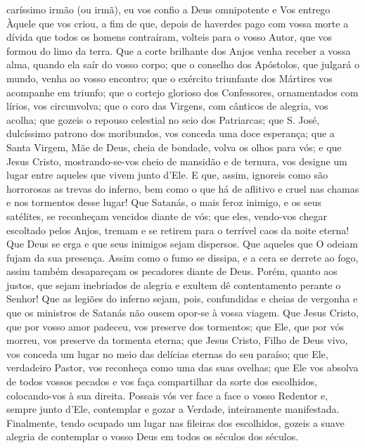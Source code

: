 \begin{paracol}{2}
{ caríssimo irmão (ou irmã), eu vos confio a Deus omnipotente e Vos entrego Àquele que vos criou, a fim de que, depois de haverdes pago com vossa morte a dívida que todos os homens contraíram, volteis para o vosso Autor, que vos formou do limo da terra. Que a corte brilhante dos Anjos venha receber a vossa alma, quando ela saír do vosso corpo; que o conselho dos Apóstolos, que julgará o mundo, venha ao vosso encontro; que o exército triunfante dos Mártires vos acompanhe em triunfo; que o cortejo glorioso dos Confessores, ornamentados com lírios, vos circunvolva; que o coro das Virgens, com cânticos de alegria, vos acolha; que gozeis o repouso celestial no seio dos Patriarcas; que S. José, dulcíssimo patrono dos moribundos, vos conceda uma doce esperança; que a Santa Virgem, Mãe de Deus, cheia de bondade, volva os olhos para vós; e que Jesus Cristo, mostrando-se-vos cheio de mansidão e de ternura, vos designe um lugar entre aqueles que vivem junto d'Ele. E que, assim, ignoreis como são horrorosas as trevas do inferno, bem como o que há de aflitivo e cruel nas chamas e nos tormentos desse lugar! Que Satanás, o mais feroz inimigo, e os seus satélites, se reconheçam vencidos diante de vós; que eles, vendo-vos chegar escoltado pelos Anjos, tremam e se retirem para o terrível caos da noite eterna! Que Deus se erga e que seus inimigos sejam dispersos. Que aqueles que O odeiam fujam da sua presença. Assim como o fumo se dissipa, e a cera se derrete ao fogo, assim também desapareçam os pecadores diante de Deus. Porém, quanto aos justos, que sejam inebriados de alegria e exultem dê contentamento perante o Senhor! Que as legiões do inferno sejam, pois, confundidas e cheias de vergonha e que os ministros de Satanás não ousem opor-se à vossa viagem. Que Jesus Cristo, que por vosso amor padeceu, vos preserve dos tormentos; que Ele, que por vós morreu, vos preserve da tormenta eterna; que Jesus Cristo, Filho de Deus vivo, vos conceda um lugar no meio das delícias eternas do seu paraíso; que Ele, verdadeiro Pastor, vos reconheça como uma das suas ovelhas; que Ele vos absolva de todos vossos pecados e vos faça compartilhar da sorte dos escolhidos, colocando-vos à sua direita. Possais vós ver face a face o vosso Redentor e, sempre junto d'Ele, contemplar e gozar a Verdade, inteiramente manifestada. Finalmente, tendo ocupado um lugar nas fileiras dos escolhidos, gozeis a suave alegria de contemplar o vosso Deus em todos os séculos dos séculos.
}\switchcolumn*{}\switchcolumn{}\end{paracol}

